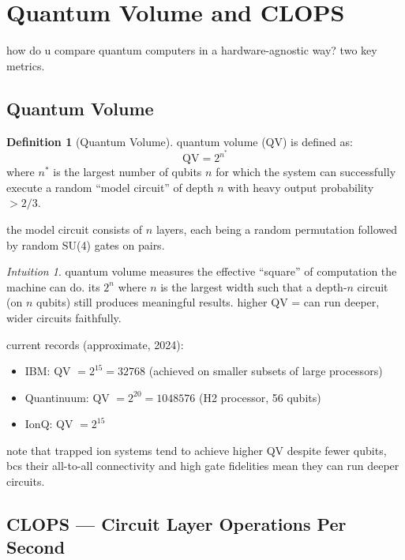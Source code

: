 \documentclass[11pt,a4paper]{article}
\theoremstyle{definition}
\newtheorem{definition}{Definition}[section]
\theoremstyle{remark}
\newtheorem*{intuition}{Intuition}
\begin{document}
\section{Quantum Volume and CLOPS}

how do u compare quantum computers in a hardware-agnostic way? two key metrics.

\subsection{Quantum Volume}

\begin{definition}[Quantum Volume]
quantum volume (QV) is defined as:
\[
\text{QV} = 2^{n^*}
\]
where $n^*$ is the largest number of qubits $n$ for which the system can successfully execute a random ``model circuit'' of depth $n$ with heavy output probability $> 2/3$.

the model circuit consists of $n$ layers, each being a random permutation followed by random SU(4) gates on pairs.
\end{definition}

\begin{intuition}
quantum volume measures the effective ``square'' of computation the machine can do. its $2^n$ where $n$ is the largest width such that a depth-$n$ circuit (on $n$ qubits) still produces meaningful results. higher QV = can run deeper, wider circuits faithfully.
\end{intuition}

current records (approximate, 2024):
\begin{itemize}[leftmargin=*]
    \item IBM: QV $= 2^{15} = 32768$ (achieved on smaller subsets of large processors)
    \item Quantinuum: QV $= 2^{20} = 1048576$ (H2 processor, 56 qubits)
    \item IonQ: QV $= 2^{15}$
\end{itemize}

note that trapped ion systems tend to achieve higher QV despite fewer qubits, bcs their all-to-all connectivity and high gate fidelities mean they can run deeper circuits.

\subsection{CLOPS --- Circuit Layer Operations Per Second}
\end{document}
